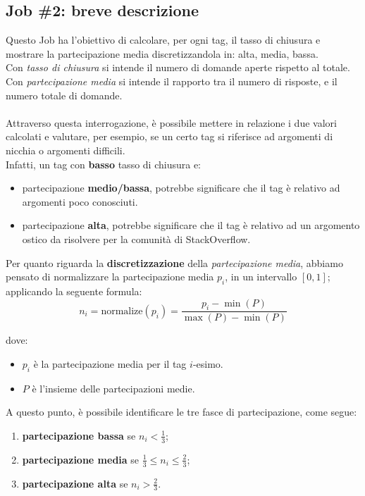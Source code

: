 \documentclass[10pt]{article}
\begin{document}
\subsection{Job \#2: breve descrizione}
Questo Job ha l'obiettivo di calcolare, per ogni tag, il tasso di chiusura e mostrare la partecipazione media discretizzandola in: alta, media, bassa.\\
Con \textit{tasso di chiusura} si intende il numero di domande aperte rispetto al totale.\\
Con \textit{partecipazione media} si intende il rapporto tra il numero di risposte, e il numero totale di domande.
\\\\
Attraverso questa interrogazione, è possibile mettere in relazione i due valori calcolati e valutare, per esempio, se un certo tag si riferisce ad argomenti di nicchia o argomenti difficili.\\
Infatti, un tag con \textbf{basso} tasso di chiusura e:
\begin{itemize}
    \item partecipazione \textbf{medio/bassa}, potrebbe significare che il tag è relativo ad argomenti poco conosciuti.
    \item partecipazione \textbf{alta}, potrebbe significare che il tag è relativo ad un argomento ostico da risolvere per la comunità di StackOverflow.
\end{itemize}

Per quanto riguarda la \textbf{discretizzazione} della \textit{partecipazione media}, abbiamo pensato di normalizzare la partecipazione media $p_i$, in un intervallo $\left[0,1\right]$; applicando la seguente formula:
\begin{equation} \label{eq1}
n_i = \text{normalize}\left(p_i\right) = \frac{p_i - \min\left(P\right)}{\max\left(P\right) - \min\left(P\right)}
\end{equation}

dove:
\begin{itemize}
    \item $p_i$ è la partecipazione media per il tag $i$-esimo.
    \item $P$ è l'insieme delle partecipazioni medie.
\end{itemize}

A questo punto, è possibile identificare le tre fasce di partecipazione, come segue:
\begin{enumerate}
    \item \textbf{partecipazione bassa} se $n_i < \frac{1}{3}$;
    \item \textbf{partecipazione media} se $\frac{1}{3} \leq n_i \leq \frac{2}{3}$;
    \item \textbf{partecipazione alta} se $n_i > \frac{2}{3}$.
\end{enumerate}
\end{document}
